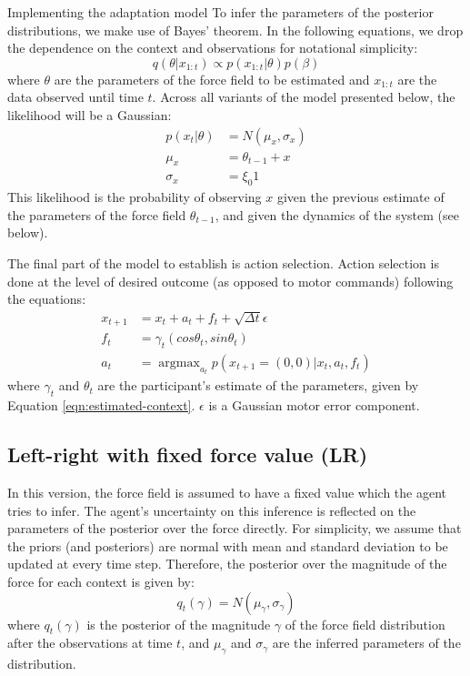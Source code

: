 \documentclass{report}
\DeclareMathOperator*{\argmax}{argmax}
\def \eref #1{Equation \ref{#1}}   %
\begin{document}
\begin{chapter}{Implementing the adaptation model}
To infer the parameters of the posterior distributions, we make use of Bayes'
theorem. In the following equations, we drop the dependence on the context and
observations for notational simplicity:
\begin{equation}
q(\theta | x_{1:t}) \propto p(x_{1:t} | \theta)p(\beta)
\end{equation}
where $\theta$ are the parameters of the force field to be estimated and
$x_{1:t}$ are the data observed until time $t$. Across all variants of the
model presented below, the likelihood will be a Gaussian:
\begin{align}
  p(x_t | \theta) &= N(\mu_x, \sigma_x)  \\
  \mu_x &= \theta_{t-1} + x \\
  \sigma_x &= \xi_0 1
\end{align}
This likelihood is the probability of observing $x$ given the previous estimate
of the parameters of the force field $\theta_{t-1}$, and given the dynamics of
the system (see below).

The final part of the model to establish is action selection. Action selection
is done at the level of desired outcome (as opposed to motor commands)
following the equations:
\begin{align}
  x_{t+1} &= x_t + a_t + f_t + \sqrt{\Delta
            t}\epsilon\\ \label{eqn:dynamics}
  f_t &= \gamma_t (cos\theta_t, sin\theta_t) \\
  a_t &= \argmax_{a_t}p(x_{t+1} = (0, 0) | x_t, a_t, f_t)
\end{align}
where $\gamma_t$ and $\theta_t$ are the participant's estimate of
the parameters, given by \eref{eqn:estimated-context}. $\epsilon$ is a Gaussian
motor error component.



\subsection{Left-right with fixed force value (LR)}
In this version, the force field is assumed to have a fixed value which the
agent tries to infer. The agent's uncertainty on this inference is reflected on
the parameters of the posterior over the force directly. For simplicity, we
assume that the priors (and posteriors) are normal with mean and standard
deviation to be updated at every time step. Therefore, the posterior over the
magnitude of the force for each context is given by:
\begin{equation}
q_t(\gamma) = N(\mu_{\gamma}, \sigma_\gamma)
\end{equation}
where $q_t(\gamma)$ is the posterior of the magnitude $\gamma$ of the force
field distribution after the observations at time $t$, and $\mu_\gamma$ and
$\sigma_\gamma$ are the inferred parameters of the distribution.


\end{chapter}
\end{document}
